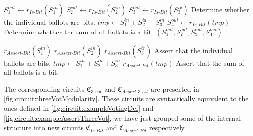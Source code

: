 \begin{Algorithmus}[h] %
    \caption{Function $r_{3\text{-}vot}$ used to check whether a ballot $b=(b_0,b_1,b_2)=(S_1^{in}, S_2^{in}, S_3^{in})$ is in the choice space $C=\{(0,0,0),(1,0,0),(0,1,0),(0,0,1)\}$. 
    $r_{3\text{-}vot}$ returns $(0,0,0,0)$ if this is the case and something else otherwise. Using $r_{Is\text{-}Bit}$.}
    \label{alg:threeVot_components}
    \begin{algorithmic}
        \State $S_1^{out}\gets r_{Is\text{-}Bit}(S_1^{in})$
        \State $S_2^{out}\gets r_{Is\text{-}Bit}(S_2^{in})$
        \State $S_3^{out}\gets r_{Is\text{-}Bit}(S_3^{in})$ \Comment Determine whether the individual ballots are bits.
        \State $tmp\gets S_1^{in}+S_2^{in}+S_3^{in}$
        \State $S_4^{out}\gets r_{Is\text{-}Bit}(tmp)$ \Comment Determine whether the sum of all ballots is a bit.
        \State \Return $(S_1^{out}, S_2^{out}, S_3^{out}, S_4^{out})$
    \EndProcedure
    \end{algorithmic}
\end{Algorithmus}

\begin{Algorithmus}[h] %
    \caption{Function $r_{Assert\text{-}3\text{-}vot}$ used to assert that a ballot $b=(b_0,b_1,b_2)=(S_1^{in}, S_2^{in}, S_3^{in})$ is in the choice space $C=\{(0,0,0),(1,0,0),(0,1,0),(0,0,1)\}$. 
    $r_{Assert\text{-}3\text{-}vot}$ returns nothing if this is the case. Otherwise, the computation of $r_{Assert\text{-}3\text{-}vot}$ results in an error. Using $r_{Assert\text{-}Bit}$.}
    \label{alg:assertThreeVot_components}
    \begin{algorithmic}
        \State $r_{Assert\text{-}Bit}(S_1^{in})$
        \State $r_{Assert\text{-}Bit}(S_2^{in})$
        \State $r_{Assert\text{-}Bit}(S_3^{in})$ \Comment Assert that the individual ballots are bits.
        \State $tmp \gets  S_1^{in}+S_2^{in}+S_3^{in}$
        \State $r_{Assert\text{-}Bit}(tmp)$ \Comment Assert that the sum of all ballots is a bit.
    \EndProcedure
    \end{algorithmic}
\end{Algorithmus}

The corresponding circuits $\mathfrak{C}_{3\text{-}vot}$ and $\mathfrak{C}_{Assert\text{-}3\text{-}vot}$ are presented in \cref{fig:circuit:threeVotModularity}.
These circuits are syntactically equivalent to the ones defined in \cref{fig:circuit:exampleVotingDef} and \cref{fig:circuit:exampleAssertThreeVot}, we have just grouped some of the internal structure into new circuits $\mathfrak{C}_{Is\text{-}Bit}$ and $\mathfrak{C}_{Assert\text{-}Bit}$ respectively.

